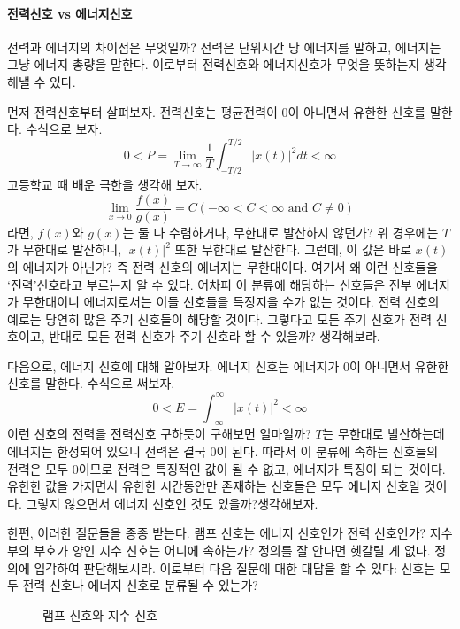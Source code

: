 \paragraph{전력신호 vs 에너지신호}
전력과 에너지의 차이점은 무엇일까? 전력은 단위시간 당 에너지를 말하고, 에너지는 그냥 에너지 총량을 말한다.
이로부터 전력신호와 에너지신호가 무엇을 뜻하는지 생각해낼 수 있다.
\par
먼저 전력신호부터 살펴보자. 전력신호는 평균전력이 0이 아니면서 유한한 신호를 말한다. 수식으로 보자.
\begin{equation*}
    0 < P = \lim_{T \rightarrow \infty} \frac{1}{T} \int_{-T/2}^{T/2} {\left\vert x(t) \right\vert}^2 dt < \infty
\end{equation*}
고등학교 때 배운 극한을 생각해 보자. 
\begin{equation*}
    \lim_{x \rightarrow 0} \frac{f(x)}{g(x)} = C (-\infty < C < \infty\text{ and }C \neq 0)
\end{equation*} 라면, $f(x)$와 $g(x)$는 둘 다 수렴하거나, 무한대로 발산하지 않던가? 위 경우에는 $T$가 무한대로 발산하니, $ {\left\vert x(t) \right\vert}^2 $ 또한 무한대로 발산한다.
그런데, 이 값은 바로 $x(t)$의 에너지가 아닌가? 즉 전력 신호의 에너지는 무한대이다.
여기서 왜 이런 신호들을 `전력'신호라고 부르는지 알 수 있다. 어차피 이 분류에 해당하는 신호들은 전부 에너지가 무한대이니 에너지로서는 이들 신호들을 특징지을 수가 없는 것이다.
전력 신호의 예로는 당연히 많은 주기 신호들이 해당할 것이다. 그렇다고 모든 주기 신호가 전력 신호이고, 반대로 모든 전력 신호가 주기 신호라 할 수 있을까? 생각해보라.
\par
다음으로, 에너지 신호에 대해 알아보자. 에너지 신호는 에너지가 0이 아니면서 유한한 신호를 말한다. 수식으로 써보자.
\begin{equation*}
    0 < E = \int_{-\infty}^{\infty} {\left\vert x(t) \right\vert}^2 < \infty
\end{equation*}
이런 신호의 전력을 전력신호 구하듯이 구해보면 얼마일까? $T$는 무한대로 발산하는데 에너지는 한정되어 있으니 전력은 결국 0이 된다.
따라서 이 분류에 속하는 신호들의 전력은 모두 0이므로 전력은 특징적인 값이 될 수 없고, 에너지가 특징이 되는 것이다.
유한한 값을 가지면서 유한한 시간동안만 존재하는 신호들은 모두 에너지 신호일 것이다. 그렇지 않으면서 에너지 신호인 것도 있을까?생각해보자.
\par
한편, 이러한 질문들을 종종 받는다. 램프 신호는 에너지 신호인가 전력 신호인가? 지수부의 부호가 양인 지수 신호는 어디에 속하는가?
정의를 잘 안다면 헷갈릴 게 없다. 정의에 입각하여 판단해보시라. 이로부터 다음 질문에 대한 대답을 할 수 있다: 신호는 모두 전력 신호나 에너지 신호로 분류될 수 있는가?
\begin{figure}[!hbp]
    \centering
    \caption{램프 신호와 지수 신호}
\end{figure}
